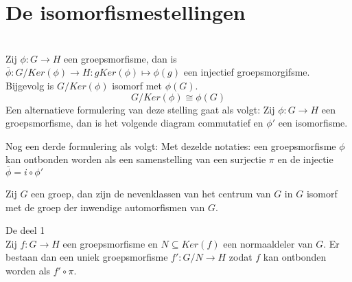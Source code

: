 \documentclass[main.tex]{subfiles}
\begin{document}
\section{De isomorfismestellingen}
\label{sec:isomorfismestellingen}

\begin{st}
  \\
  Zij $\phi: G \rightarrow H$ een groepsmorfisme, dan is $\bar{\phi}: G/Ker(\phi) \rightarrow H: gKer(\phi) \mapsto \phi(g)$ een injectief groepsmorgifsme.
  Bijgevolg is $G/Ker(\phi)$ isomorf met $\phi(G)$.
  \[ G/Ker(\phi) \cong \phi(G) \]
  Een alternatieve formulering van deze stelling gaat als volgt:
  Zij $\phi: G \rightarrow H$ een groepsmorfisme, dan is het volgende diagram commutatief en $\phi'$ een isomorfisme.
  \begin{figure}[H]
    \centering
  \end{figure}
  Nog een derde formulering als volgt:
  Met dezelde notaties: een groepsmorfisme $\phi$ kan ontbonden worden als een samenstelling van een surjectie $\pi$ en de injectie $\bar{\phi} = i \circ \phi'$
\end{st}

\begin{pr}
  Zij $G$ een groep, dan zijn de nevenklassen van het centrum van $G$ in $G$ isomorf met de groep der inwendige automorfismen van $G$.
\end{pr}

\begin{st}
De  deel 1\\
Zij $f: G\rightarrow H$ een groepsmorfisme en $N\subseteq Ker(f)$ een normaaldeler van $G$.
Er bestaan dan een uniek groepsmorfisme $f':G/N \rightarrow H$ zodat $f$ kan ontbonden worden als $f'\circ \pi$.
\end{st}
\end{document}

